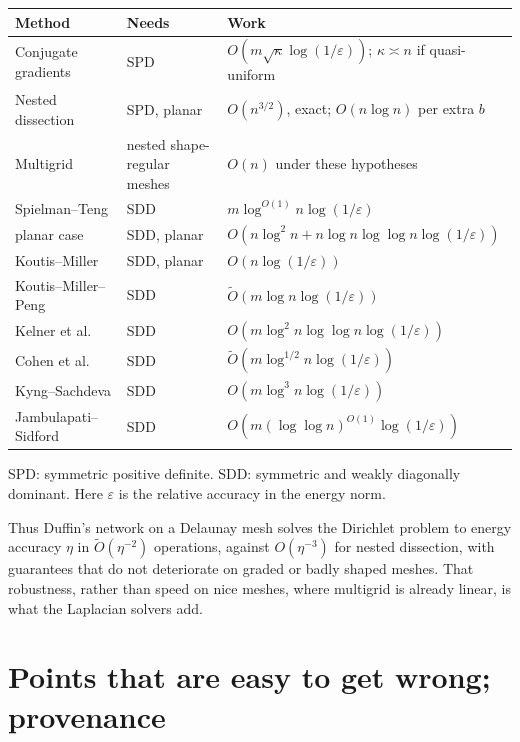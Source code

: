 \documentclass[11pt]{amsart}
\theoremstyle{definition}
\theoremstyle{remark}
\newcommand{\Ot}{\widetilde{O}}
\newcommand{\eps}{\varepsilon}
\begin{document}
\medskip
\begin{center}
\small
\begin{tabular}{@{}lll@{}}
\toprule
Method & Needs & Work \\
\midrule
Conjugate gradients & SPD & $O(m\sqrt{\kappa}\log(1/\eps))$; $\kappa\asymp n$ if quasi-uniform\\
Nested dissection \cite{Geo73,LRT79} & SPD, planar & $O(n^{3/2})$, exact; $O(n\log n)$ per extra $b$\\
Multigrid & nested shape-regular meshes & $O(n)$ under these hypotheses\\
Spielman--Teng \cite{STsolve} & SDD & $m\log^{O(1)}n\log(1/\eps)$\\
\quad planar case & SDD, planar & $O(n\log^2n+n\log n\log\log n\log(1/\eps))$\\
Koutis--Miller \cite{KM07} & SDD, planar & $O(n\log(1/\eps))$\\
Koutis--Miller--Peng \cite{KMP10,KMP11} & SDD & $\Ot(m\log n\log(1/\eps))$\\
Kelner et al.\ \cite{KOSZ13} & SDD & $O(m\log^2n\log\log n\log(1/\eps))$\\
Cohen et al.\ \cite{CKMPPRX14} & SDD & $\Ot(m\log^{1/2}n\log(1/\eps))$\\
Kyng--Sachdeva \cite{KS16} & SDD & $O(m\log^3n\log(1/\eps))$\\
Jambulapati--Sidford \cite{JS21} & SDD & $O(m(\log\log n)^{O(1)}\log(1/\eps))$\\
\bottomrule
\end{tabular}

\smallskip
{\footnotesize SPD: symmetric positive definite. SDD: symmetric and weakly diagonally dominant. Here $\eps$ is the relative accuracy in the energy norm.}
\end{center}
\medskip

Thus Duffin's network on a Delaunay mesh solves the Dirichlet problem to energy accuracy $\eta$ in $\Ot(\eta^{-2})$ operations, against $O(\eta^{-3})$ for nested dissection, with guarantees that do not deteriorate on graded or badly shaped meshes. That robustness,
rather than speed on nice meshes, where multigrid is already linear, is what the Laplacian solvers add.

\section{Points that are easy to get wrong; provenance}\label{sec:wrong}
\end{document}
